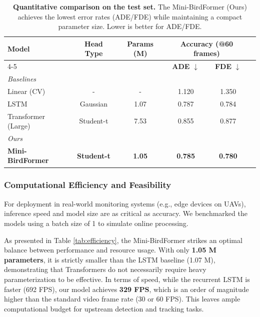 \documentclass[11pt]{article}
\begin{document}
\begin{table}[h]
	\centering
	\caption{\textbf{Quantitative comparison on the test set.} The Mini-BirdFormer (Ours) achieves the lowest error rates (ADE/FDE) while maintaining a compact parameter size. Lower is better for ADE/FDE.}
	\label{tab:main_results}
	\setlength{\tabcolsep}{5pt} %
	\begin{tabular}{lccccc}
		\toprule
		\multirow{2}{*}{\textbf{Model}} & \multirow{2}{*}{\textbf{Head Type}} & \multirow{2}{*}{\textbf{Params (M)}} & \multicolumn{2}{c}{\textbf{Accuracy (@60 frames)}} \\ \cmidrule(lr){4-5}
		& & & \textbf{ADE} $\downarrow$ & \textbf{FDE} $\downarrow$ \\ \midrule
		\multicolumn{5}{l}{\textit{Baselines}} \\
		Linear (CV) & - & - & 1.120 & 1.350 \\
		LSTM & Gaussian & 1.07 & 0.787 & 0.784 \\
		Transformer (Large) & Student-t & 7.53 & 0.855 & 0.877 \\ \midrule
		\multicolumn{5}{l}{\textit{Ours}} \\
		\textbf{Mini-BirdFormer} & \textbf{Student-t} & \textbf{1.05} & \textbf{0.785} & \textbf{0.780} \\ \bottomrule
	\end{tabular}
\end{table}

\subsubsection{Computational Efficiency and Feasibility}
For deployment in real-world monitoring systems (e.g., edge devices on UAVs), inference speed and model size are as critical as accuracy. We benchmarked the models using a batch size of 1 to simulate online processing.

As presented in Table \ref{tab:efficiency}, the Mini-BirdFormer strikes an optimal balance between performance and resource usage. With only \textbf{1.05 M parameters}, it is strictly smaller than the LSTM baseline (1.07 M), demonstrating that Transformers do not necessarily require heavy parameterization to be effective. 
In terms of speed, while the recurrent LSTM is faster (692 FPS), our model achieves \textbf{329 FPS}, which is an order of magnitude higher than the standard video frame rate (30 or 60 FPS). This leaves ample computational budget for upstream detection and tracking tasks.
\end{document}
